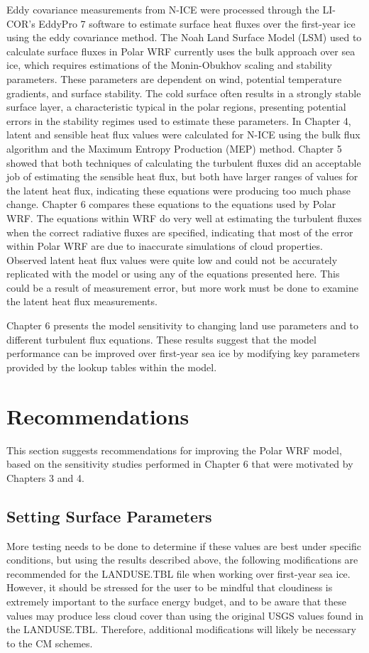 Eddy covariance measurements from N-ICE were processed through the LI-COR’s EddyPro 7 software to estimate surface heat fluxes over the first-year ice using the eddy covariance method. The Noah Land Surface Model (LSM) used to calculate surface fluxes in Polar WRF currently uses the bulk approach over sea ice, which requires estimations of the Monin-Obukhov scaling and stability parameters. These parameters are dependent on wind, potential temperature gradients, and surface stability. The cold surface often results in a strongly stable surface layer, a characteristic typical in the polar regions, presenting potential errors in the stability regimes used to estimate these parameters. In Chapter 4, latent and sensible heat flux values were calculated for N-ICE using the bulk flux algorithm and the Maximum Entropy Production (MEP) method. Chapter 5 showed that both techniques of calculating the turbulent fluxes did an acceptable job of estimating the sensible heat flux, but both have larger ranges of values for the latent heat flux, indicating these equations were producing too much phase change. Chapter 6 compares these equations to the equations used by Polar WRF. The equations within WRF do very well at estimating the turbulent fluxes when the correct radiative fluxes are specified, indicating that most of the error within Polar WRF are due to inaccurate simulations of cloud properties. Observed latent heat flux values were quite low and could not be accurately replicated with the model or using any of the equations presented here. This could be a result of measurement error, but more work must be done to examine the latent heat flux measurements.

Chapter 6 presents the model sensitivity to changing land use parameters and to different turbulent flux equations. These results suggest that the model performance can be improved over first-year sea ice by modifying key parameters provided by the lookup tables within the model. 

\section{Recommendations}
This section suggests recommendations for improving the Polar WRF model, based on the sensitivity studies performed in Chapter 6 that were motivated by Chapters 3 and 4.

\subsection{Setting Surface Parameters}
More testing needs to be done to determine if these values are best under specific conditions, but using the results described above, the following modifications are recommended for the LANDUSE.TBL file when working over first-year sea ice. However, it should be stressed for the user to be mindful that cloudiness is extremely important to the surface energy budget, and to be aware that these values may produce less cloud cover than using the original USGS values found in the LANDUSE.TBL. Therefore, additional modifications will likely be necessary to the CM schemes.

